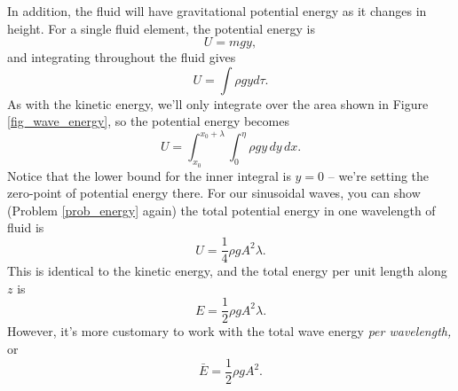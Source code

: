 In addition, the fluid will have gravitational potential energy as it changes in height.  For a single fluid element, the potential energy is
\[
U = mgy,
\]
and integrating throughout the fluid gives
\begin{equation}
U = \int \rho g y d\tau.
\end{equation}
As with the kinetic energy, we'll only integrate over the area shown in Figure \ref{fig_wave_energy}, so the potential energy becomes
\begin{equation}
U = \int_{x_0}^{x_0 + \lambda} \int_{0}^{\eta} \rho g y \, dy \, dx.
\end{equation}
Notice that the lower bound for the inner integral is $y=0$ -- we're setting the zero-point of potential energy there.  For our sinusoidal waves, you can show (Problem \ref{prob_energy} again) the total potential energy in one wavelength of fluid is
\begin{equation}
U = \frac{1}{4} \rho g A^2 \lambda. 
\end{equation}
This is identical to the kinetic energy, and the total energy per unit length along $z$ is
\[
E = \frac{1}{2} \rho g A^2 \lambda.
\]
However, it's more customary to work with the total wave energy \emph{per wavelength,} or
\begin{equation}
\label{eq_wave_energy}
\bar{E} = \frac{1}{2} \rho g A^2.
\end{equation} 

